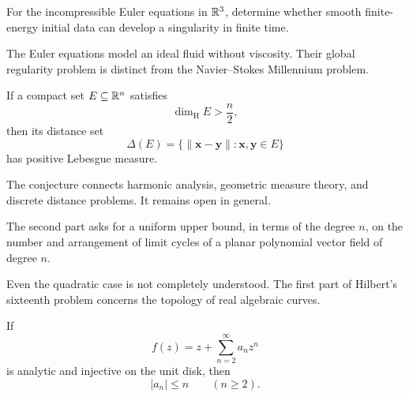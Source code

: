     \begin{openproblem}
        For the incompressible Euler equations in $\mathbb{R}^3$, determine whether
        smooth finite-energy initial data can develop a singularity in finite
        time.
    \end{openproblem}

    \begin{remark}
        The Euler equations model an ideal fluid without viscosity. Their global
        regularity problem is distinct from the Navier--Stokes Millennium
        problem.
    \end{remark}

    \begin{conjecture}
        If a compact set $E\subseteq\mathbb{R}^n$ satisfies
        \[
            \dim_{\mathrm{H}}E>\frac{n}{2},
        \]
        then its distance set
        \[
            \Delta(E)
            =
            \{\|\mathbf{x}-\mathbf{y}\|:\mathbf{x},\mathbf{y}\in E\}
        \]
        has positive Lebesgue measure.
    \end{conjecture}

    \begin{remark}
        The conjecture connects harmonic analysis, geometric measure theory,
        and discrete distance problems. It remains open in general.
    \end{remark}

    \begin{openproblem}
        The second part asks for a uniform upper bound, in terms of the degree
        $n$, on the number and arrangement of limit cycles of a planar
        polynomial vector field of degree $n$.
    \end{openproblem}

    \begin{remark}
        Even the quadratic case is not completely understood. The first part of
        Hilbert's sixteenth problem concerns the topology of real algebraic
        curves.
    \end{remark}

    \begin{theorem}
        If
        \[
            f(z)=z+\sum_{n=2}^{\infty}a_nz^n
        \]
        is analytic and injective on the unit disk, then
        \[
            |a_n|\leq n
            \qquad
            (n\geq 2).
        \]
    \end{theorem}

